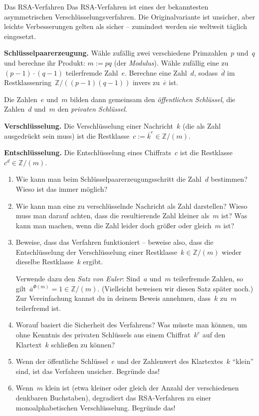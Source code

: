 \documentclass{../zirkelblatt}
\newcommand{\ol}[1]{\ensuremath{\overline{#1}}}
\newcommand{\ZZ}{\mathbb{Z}}
\begin{document}
\begin{aufgabe}{Das RSA-Verfahren}
Das RSA-Verfahren ist eines der bekanntesten asymmetrischen
Verschlüsselungsverfahren. Die Originalvariante ist unsicher, aber leichte
Verbesserungen gelten als sicher -- zumindest werden sie weltweit täglich
eingesetzt.

\begin{shaded}
\textbf{Schlüsselpaarerzeugung.} Wähle zufällig zwei verschiedene Primzahlen~$p$ und~$q$ und
berechne ihr Produkt: $m := p q$ (der \emph{Modulus}). Wähle zufällig eine
zu~$(p-1) \cdot (q-1)$ teilerfremde Zahl~$e$. Berechne eine Zahl~$d$,
sodass~$\ol{d}$ im Restklassenring~$\ZZ/((p-1)(q-1))$ invers zu~$\ol{e}$ ist.

Die Zahlen~$e$ und~$m$ bilden dann gemeinsam den \emph{öffentlichen Schlüssel},
die Zahlen~$d$ und~$m$ den \emph{privaten Schlüssel}.

\textbf{Verschlüsselung.} Die Verschlüsselung einer Nachricht~$k$ (die als Zahl
ausgedrückt sein muss) ist die Restklasse~$c := \ol{k}^e \in \ZZ/(m)$.

\textbf{Entschlüsselung.} Die Entschlüsselung eines Chiffrats~$c$ ist die
Restklasse~$c^d \in \ZZ/(m)$.
\end{shaded}

\begin{enumerate}
\item Wie kann man beim Schlüsselpaarerzeugungsschritt die Zahl~$d$ bestimmen?
Wieso ist das immer möglich?
\item Wie kann man eine zu verschlüsselnde Nachricht als Zahl darstellen? Wieso
muss man darauf achten, dass die resultierende Zahl kleiner als~$m$ ist? Was
kann man machen, wenn die Zahl leider doch größer oder gleich~$m$ ist?
\item Beweise, dass das Verfahren funktioniert -- beweise also, dass die
Entschlüsselung der Verschlüsselung einer Restklasse~$k \in \ZZ/(m)$ wieder
dieselbe Restklasse~$k$ ergibt.

Verwende dazu den \emph{Satz von Euler}: Sind~$a$ und~$m$ teilerfremde Zahlen,
so gilt~$\ol{a}^{\Phi(m)} = 1 \in \ZZ/(m)$. (Vielleicht beweisen wir diesen
Satz später noch.) Zur Vereinfachung kannst du in deinem Beweis annehmen,
dass~$k$ zu~$m$ teilerfremd ist.
\item Worauf basiert die Sicherheit des Verfahrens? Was müsste man können, um
ohne Kenntnis des privaten Schlüssels aus einem Chiffrat~$k^e$ auf den
Klartext~$k$ schließen zu können?
\item Wenn der öffentliche Schlüssel~$e$ und der Zahlenwert des Klartextes~$k$
"`klein"' sind, ist das Verfahren unsicher. Begründe das!
\item Wenn~$m$ klein ist (etwa kleiner oder gleich der Anzahl der verschiedenen
denkbaren Buchstaben), degradiert das RSA-Verfahren zu einer monoalphabetischen
Verschlüsselung. Begründe das!
\end{enumerate}
\end{aufgabe}
\end{document}
